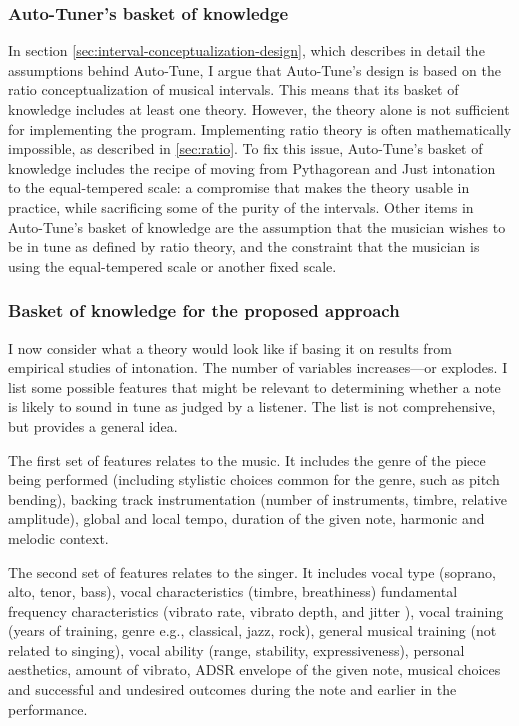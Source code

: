 \subsubsection{Auto-Tuner's basket of knowledge}
In section \ref{sec:interval-conceptualization-design}, which describes in detail the assumptions behind Auto-Tune, I argue that Auto-Tune's design is based on the ratio conceptualization of musical intervals. This means that its basket of knowledge includes at least one theory. However, the theory alone is not sufficient for implementing the program. Implementing ratio theory is often mathematically impossible, as described in \ref{sec:ratio}. To fix this issue, Auto-Tune's basket of knowledge includes the recipe of moving from Pythagorean and Just intonation to the equal-tempered scale: a compromise that makes the theory usable in practice, while sacrificing some of the purity of the intervals. Other items in Auto-Tune's basket of knowledge are the assumption that the musician wishes to be in tune as defined by ratio theory, and the constraint that the musician is using the equal-tempered scale or another fixed scale.

\subsubsection{Basket of knowledge for the proposed approach}
I now consider what a theory would look like if basing it on results from empirical studies of intonation. The number of variables increases---or explodes. I list some possible features that might be relevant to determining whether a note is likely to sound in tune as judged by a listener. The list is not comprehensive, but provides a general idea.

The first set of features relates to the music. It includes the genre of the piece being performed (including stylistic choices common for the genre, such as pitch bending), backing track instrumentation (number of instruments, timbre, relative amplitude), global and local tempo, duration of the given note, harmonic and melodic context.

The second set of features relates to the singer. It includes vocal type (soprano, alto, tenor, bass), vocal characteristics (timbre, breathiness) fundamental frequency characteristics (vibrato rate, vibrato depth, and jitter \cite{devaney2020new}), vocal training (years of training, genre e.g., classical, jazz, rock), general musical training (not related to singing), vocal ability (range, stability, expressiveness), personal aesthetics, amount of vibrato, ADSR envelope of the given note, musical choices and successful and undesired outcomes during the note and earlier in the performance.

